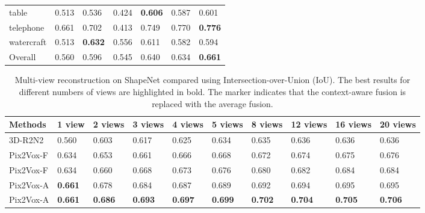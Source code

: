 \documentclass[10pt,twocolumn,letterpaper]{article}
\begin{document}
\begin{table*}[!t]
\begin{tabularx}{\linewidth}{XYYYYYY}
    table        & 0.513      & 0.536      & 0.424
                 & \bf{0.606} & 0.587      & 0.601 \\
    telephone    & 0.661      & 0.702      & 0.413
                 & 0.749      & 0.770      & \bf{0.776} \\
    watercraft   & 0.513      & \bf{0.632} & 0.556
                 & 0.611      & 0.582      & 0.594  \\
    \midrule
    Overall      & 0.560      & 0.596      & 0.545
                 & 0.640      & 0.634      & \bf{0.661} \\
    \bottomrule
  \end{tabularx}
  \label{tab:shapenet-reconstruction}
\end{table*}

\begin{table*}[!t]
  \caption{Multi-view reconstruction on ShapeNet compared using Intersection-over-Union (IoU). The best results for different numbers of views are highlighted in bold. The marker  indicates that the context-aware fusion is replaced with the average fusion.}
  \vspace{-2 mm}
  \centering
  \begin{tabularx}{\linewidth}{lYYYYYYYYY}
    \toprule
    Methods   & 1 view         & 2 views        & 3 views
              & 4 views        & 5 views        & 8 views
              & 12 views       & 16 views       & 20 views \\
    \midrule
    3D-R2N2   \cite{DBLP:conf/eccv/ChoyXGCS16}
              & 0.560          & 0.603          & 0.617
              & 0.625          & 0.634          & 0.635
              & 0.636          & 0.636          & 0.636 \\
    Pix2Vox-F \hspace{.6mm} 
              & 0.634          & 0.653          & 0.661
              & 0.666          & 0.668          & 0.672
              & 0.674          & 0.675          & 0.676 \\
    Pix2Vox-F 
              & 0.634          & 0.660          & 0.668
              & 0.673          & 0.676          & 0.680
              & 0.682          & 0.684          & 0.684 \\
    Pix2Vox-A 
              & \textbf{0.661} & 0.678          & 0.684
              & 0.687          & 0.689          & 0.692
              & 0.694          & 0.695          & 0.695 \\
    Pix2Vox-A & \textbf{0.661} & \textbf{0.686} & \textbf{0.693}
              & \textbf{0.697} & \textbf{0.699} & \textbf{0.702}
              & \textbf{0.704} & \textbf{0.705} & \textbf{0.706} \\
    \bottomrule
  \end{tabularx}
  \label{tab:shapenet-multi-view-reconstruction}
\end{table*}
\end{document}
